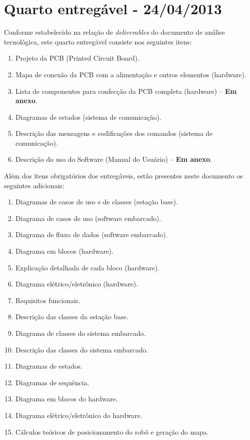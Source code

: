 \chapter{Quarto entregável - 24/04/2013}

Conforme estabelecido na relação de \textit{deliverables} do documento de análise tecnológica, este quarto entregável consiste nos seguintes itens:
\begin{enumerate}[topsep=0pt, partopsep=0pt, itemsep=0pt]
	\item Projeto da PCB (Printed Circuit Board).
	\item Mapa de conexão da PCB com a alimentação e outros elementos (hardware).
	\item Lista de componentes para confecção da PCB completa (hardware) -- \textbf{Em anexo}.
	\item Diagramas de estados (sistema de comunicação).
	\item Descrição das mensagens e codificações dos comandos (sistema de comunicação).
	\item Descrição do uso do Software (Manual do Usuário) -- \textbf{Em anexo}.
\end{enumerate}

\vspace{12pt}

Além dos itens obrigatórios dos entregáveis, estão presentes neste documento os seguintes adicionais:
\begin{enumerate}
      \item Diagramas de casos de uso e de classes (estação base).
      \item Diagrama de casos de uso (software embarcado).
      \item Diagrama de fluxo de dados (software embarcado).
      \item Diagrama em blocos (hardware).
      \item Explicação detalhada de cada bloco (hardware).
      \item Diagrama elétrico/eletrônico (hardware).
	\item Requisitos funcionais.
	\item Descrição das classes da estação base.
	\item Diagrama de classes do sistema embarcado.
	\item Descrição das classes do sistema embarcado.
	\item Diagramas de estados.
	\item Diagramas de sequência.
	\item Diagrama em blocos do hardware.
	\item Diagrama elétrico/eletrônico do hardware.
	\item Cálculos teóricos de posicionamento do robô e geração do mapa.
\end{enumerate}
